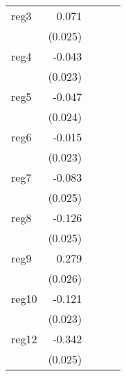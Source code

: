 {\begin{longtable}{l*{4}{D{.}{.}{-1}}}
\addlinespace
reg3        &       0.071\sym{**} &                     &                     &                     \\
            &     (0.025)         &                     &                     &                     \\
\addlinespace
reg4        &      -0.043         &                     &                     &                     \\
            &     (0.023)         &                     &                     &                     \\
\addlinespace
reg5        &      -0.047         &                     &                     &                     \\
            &     (0.024)         &                     &                     &                     \\
\addlinespace
reg6        &      -0.015         &                     &                     &                     \\
            &     (0.023)         &                     &                     &                     \\
\addlinespace
reg7        &      -0.083\sym{**} &                     &                     &                     \\
            &     (0.025)         &                     &                     &                     \\
\addlinespace
reg8        &      -0.126\sym{***}&                     &                     &                     \\
            &     (0.025)         &                     &                     &                     \\
\addlinespace
reg9        &       0.279\sym{***}&                     &                     &                     \\
            &     (0.026)         &                     &                     &                     \\
\addlinespace
reg10       &      -0.121\sym{***}&                     &                     &                     \\
            &     (0.023)         &                     &                     &                     \\
\addlinespace
reg12       &      -0.342\sym{***}&                     &                     &                     \\
            &     (0.025)         &                     &                     &                     \\

\end{longtable}}
